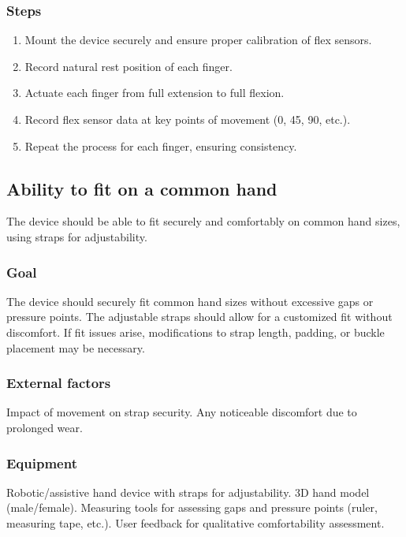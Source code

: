 \documentclass{article}
\begin{document}
\subsubsection{Steps}
\begin{enumerate}
    \item Mount the device securely and ensure proper calibration of flex sensors.
    \item Record natural rest position of each finger.
    \item Actuate each finger from full extension to full flexion.
    \item Record flex sensor data at key points of movement (0, 45, 90, etc.).
    \item Repeat the process for each finger, ensuring consistency.
\end{enumerate}

\subsection{Ability to fit on a common hand}
The device should be able to fit securely and comfortably on common hand sizes, using straps for adjustability.

\subsubsection{Goal} The device should securely fit common hand sizes without excessive gaps or pressure points. The adjustable straps should allow for a customized fit without discomfort. If fit issues arise, modifications to strap length, padding, or buckle placement may be necessary.

\subsubsection{External factors} Impact of movement on strap security. Any noticeable discomfort due to prolonged wear.

\subsubsection{Equipment} Robotic/assistive hand device with straps for adjustability. 3D hand model (male/female). Measuring tools for assessing gaps and pressure points (ruler, measuring tape, etc.). User feedback for qualitative comfortability assessment.
\end{document}

